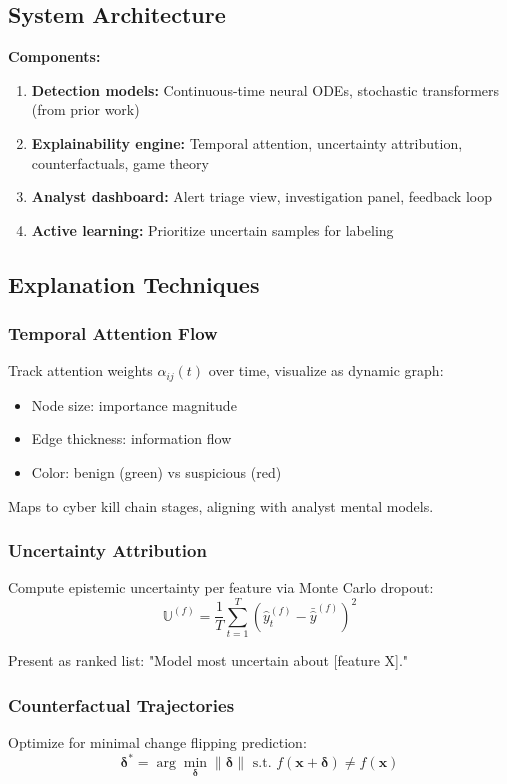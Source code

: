 \documentclass[letterpaper,twocolumn,10pt]{article}
\begin{document}
\subsection{System Architecture}

\textbf{Components:}
\begin{enumerate}
\item \textbf{Detection models:} Continuous-time neural ODEs, stochastic transformers (from prior work)
\item \textbf{Explainability engine:} Temporal attention, uncertainty attribution, counterfactuals, game theory
\item \textbf{Analyst dashboard:} Alert triage view, investigation panel, feedback loop
\item \textbf{Active learning:} Prioritize uncertain samples for labeling
\end{enumerate}

\subsection{Explanation Techniques}

\subsubsection{Temporal Attention Flow}
Track attention weights $\alpha_{ij}(t)$ over time, visualize as dynamic graph:
\begin{itemize}
\item Node size: importance magnitude
\item Edge thickness: information flow
\item Color: benign (green) vs suspicious (red)
\end{itemize}

Maps to cyber kill chain stages, aligning with analyst mental models.

\subsubsection{Uncertainty Attribution}
Compute epistemic uncertainty per feature via Monte Carlo dropout:
\begin{equation}
\mathbb{U}^{(f)} = \frac{1}{T}\sum_{t=1}^T (\hat{y}_t^{(f)} - \bar{\hat{y}}^{(f)})^2
\end{equation}

Present as ranked list: "Model most uncertain about [feature X]."

\subsubsection{Counterfactual Trajectories}
Optimize for minimal change flipping prediction:
\begin{equation}
\boldsymbol{\delta}^* = \arg\min_{\boldsymbol{\delta}} \|\boldsymbol{\delta}\| \text{ s.t. } f(\mathbf{x} + \boldsymbol{\delta}) \neq f(\mathbf{x})
\end{equation}
\end{document}
